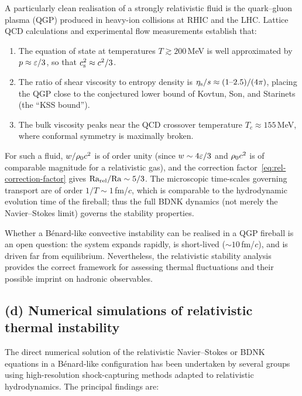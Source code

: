 A particularly clean realisation of a strongly relativistic fluid is the
quark--gluon plasma (QGP) produced in heavy-ion collisions at RHIC and
the LHC.  Lattice QCD calculations and experimental flow measurements
establish that:
\begin{enumerate}
\item The equation of state at temperatures $T \gtrsim 200$\,MeV is
  well approximated by $p \approx \varepsilon/3$, so that
  $c_{\mathrm{s}}^{2} \approx c^{2}/3$.
\item The ratio of shear viscosity to entropy density is
  $\eta_{\mathrm{s}}/s \approx (1\text{--}2.5)/(4\pi)$, placing the QGP
  close to the conjectured lower bound of Kovtun, Son, and
  Starinets (the ``KSS bound'').
\item The bulk viscosity peaks near the QCD crossover temperature
  $T_{c}\approx 155$\,MeV, where conformal symmetry is maximally broken.
\end{enumerate}

For such a fluid, $w/\rho_0 c^{2}$ is of order unity
(since $w \sim 4\varepsilon/3$ and $\rho_0 c^{2}$ is of
comparable magnitude for a relativistic gas), and the correction
factor~\eqref{eq:rel-correction-factor} gives
$\mathrm{Ra}_{\mathrm{rel}}/\mathrm{Ra} \sim 5/3$.  The microscopic time-scales governing
transport are of order $1/T \sim 1$\,fm/$c$, which is comparable to
the hydrodynamic evolution time of the fireball; thus the full
BDNK dynamics (not merely the Navier--Stokes limit) governs
the stability properties.

Whether a B\'enard-like convective instability can be realised in a QGP
fireball is an open question: the system expands rapidly, is
short-lived ($\sim 10$\,fm/$c$), and is driven far from equilibrium.
Nevertheless, the relativistic stability analysis provides the
correct framework for assessing thermal fluctuations and their
possible imprint on hadronic observables.


\subsection*{(d) Numerical simulations of relativistic thermal instability}

The direct numerical solution of the relativistic Navier--Stokes or
BDNK equations in a B\'enard-like configuration has been
undertaken by several groups using high-resolution shock-capturing
methods adapted to relativistic hydrodynamics.  The principal findings
are:


